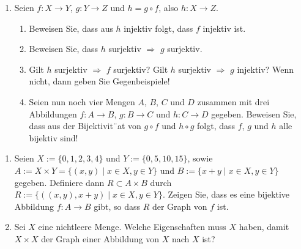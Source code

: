 \documentclass{../problemset}
\begin{document}
\pagebreak

\begin{problem}
\begin{enumerate}
	\item Seien $f: X \to Y$, $g: Y \to Z$ und $h = g \circ f$, also $h: X \to Z$.
	      \begin{enumerate}
		      \item Beweisen Sie, dass aus $h$ injektiv folgt, dass $f$ injektiv ist.
		      \item Beweisen Sie, dass $h$ surjektiv $\Rightarrow$ $g$ surjektiv.
		      \item Gilt $h$ surjektiv $\Rightarrow$ $f$ surjektiv? Gilt $h$ surjektiv $\Rightarrow$ $g$ injektiv? Wenn nicht, dann geben Sie Gegenbeispiele!
		      \item Seien nun noch vier Mengen $A$, $B$, $C$ und $D$ zusammen mit drei Abbildungen $f: A \to B$, $g: B \to C$ und $h: C \to D$ gegeben. Beweisen Sie, dass aus der Bijektivit¨at von $g \circ f$ und $h \circ g$ folgt, dass $f$, $g$ und $h$ alle bijektiv sind!
	      \end{enumerate}

\end{enumerate}
\end{problem}

\pagebreak

\begin{problem}[Graphen]
\begin{enumerate}
	\item Seien $X := \{0, 1, 2, 3, 4\}$ und $Y := \{0, 5, 10, 15\}$, sowie $A := X \times Y = \{(x, y) \mid x \in X, y \in Y\}$ und $B := \{x + y \mid x \in X, y \in Y\}$ gegeben. Definiere dann $R \subset A \times B$ durch $R := \{((x, y), x + y) \mid x \in X, y \in Y\}$.
	      Zeigen Sie, dass es eine bijektive Abbildung $f : A \to B$ gibt, so dass $R$ der Graph von $f$ ist.

	\item Sei $X$ eine nichtleere Menge. Welche Eigenschaften muss $X$ haben, damit $X \times X$ der Graph einer Abbildung von $X$ nach $X$ ist?

\end{enumerate}
\end{problem}

\pagebreak
\end{document}
